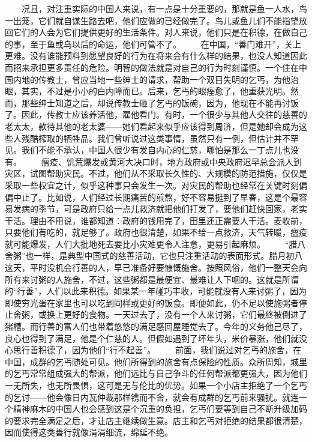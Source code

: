 \documentclass[12pt,oneside]{book}
\begin{document}
\begin{common-format}
　　况且，对注重实际的中国人来说，有一点是十分重要的，那就是鱼一人水，鸟一出笼，它们就自谋生路去吧，他们应做的已经做完了。鸟儿或鱼儿们不能指望放回它们的人会为它们提供更好的生活条件。对人来说，他们只是在积德，在做自己的事，至于鱼或鸟以后的命运，他们可管不了。 
　　在中国，“善门难开”，关上更难。没有谁能预料到愿望良好的行为在将来会有什么样的结果，也没人知道因此而招来承担更多责任的危险。明智的做法就是对自己的行为时刻谨慎。一个住在中国内地的传教士，曾应当地一些绅士的请求，帮助一个双目失明的乞丐，为他治眼，其实，不过是小小的白内障而已。后来，乞丐的眼痊愈了，他重获光明。然而，那些绅士知道之后，却说传教士砸了乞丐的饭碗，因为，他现在不能再讨饭了。因此，传教士应该养活他，雇他看门。有时，一个很少与其他人交往的慈善的老太太，款待其他的老太婆——她们看起来似乎应该得到周济，但是她却会成为这些人残酷榨取的牺牲品。我们曾听说过这类事情，虽然只有一例，但估计并不罕见。我们不能不承认，中国人很少有发自内心的仁慈，哪怕是那么一丁点儿也没有。 
　　瘟疫、饥荒爆发或黄河大决口时，地方政府或中央政府迟早总会派人到灾区，试图帮助灾民。不过，他们从不采取长久性的、大规模的防范措施，仅仅是采取一些权宜之计，似乎这种事只会发生一次。对灾民的帮助也经常在关键时刻偏偏中止了。比如说，人们经过长期痛苦的煎熬，好不容易挺到了早春，这是个最容易发病的季节，可是政府只给一点儿救济就把他们打发了，要他们赶快回家，老实干活。理由不用说，谁都知道：政府的钱用完了，田里还正需要人干活。麦收前，只要他们有吃的，就足够了。政府也很清楚，如果不给一点救济，天气转暖，瘟疫就可能爆发，人们大批地死去要比小灾难更令人注意，更易引起麻烦。 
　　“腊八舍粥”也一样，是典型中国式的慈善活动，它也只注重活动的表面形式。腊月初八这天，平时没机会行善的人，早已准备好要慷慨施舍。按照风俗，他们一整天会向所有来讨粥的人施舍，不过，这些粥都是最便宜、最难让人下咽的。这就是所谓的“行善”，人们以此来积德。如果某一年碰巧丰收，可能就没有人来讨粥了，因为即使穷光蛋在家里也可以吃到同样或更好的饭食。即便如此，仍不足以使施粥者停止舍粥，或换上更好的食物。一天过去了，没有一个人来讨粥，它们最终被倒进了猪槽。而行善的富人们也带着悠悠的满足感回屋睡觉去了。今年的义务他己尽了，良心也得到了满足，他是个仁慈的人。但假如遇到了坏年头，米价暴涨，他们就没心思行善积德了，因为他们“行不起善”。 
　　前面，我们说过对乞丐的施舍，在中国，成群的乞丐随处可见。他们所得到的施舍有点保险的性质。众所周知，城里的乞丐常常组成强大的帮派，他们远比与自己争斗的任何帮派都更强大，因为他们一无所失，也无所畏惧，这可是无与伦比的优势。如果一个小店主拒绝了一个乞丐的乞讨——他会像日内瓦仲裁那样镌而不舍，就会有成群的乞丐前来骚扰。就连一个精神麻木的中国人也会感到这是个沉重的负担，乞丐们要等到自己不断升级加码的要求完全满足之后，才让店主继续做生意。店主和乞丐对拒绝的结果都很清楚，因而使得这类善行就像涓涓细流，绵延不绝。 

\end{common-format}
\end{document}
